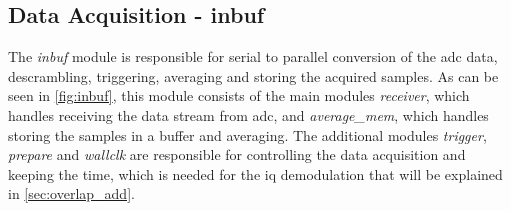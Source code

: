\documentclass[12pt,a4paper,parskip=full,abstract=true,BCOR=12mm,twoside,open=right]{scrreprt}
\def\device#1{\textit{#1}}
\begin{document}

\subsection[Data Acquisition]{Data Acquisition - inbuf}
\label{sec:acquisition}

The \device{inbuf} module is responsible for serial to parallel conversion
of the \gls{adc} data, descrambling, triggering, averaging and storing
the acquired samples. As can be seen in \cref{fig:inbuf}, this module consists
of the main modules \device{receiver}, which handles receiving the data stream from
\gls{adc}, and \device{average\_mem}, which handles storing the samples in a buffer
and averaging. The additional modules \device{trigger}, \device{prepare} and
\device{wallclk} are responsible for controlling the data acquisition and keeping
the time, which is needed for the \gls{iq} demodulation that will be explained in \cref{sec:overlap_add}.
\end{document}
